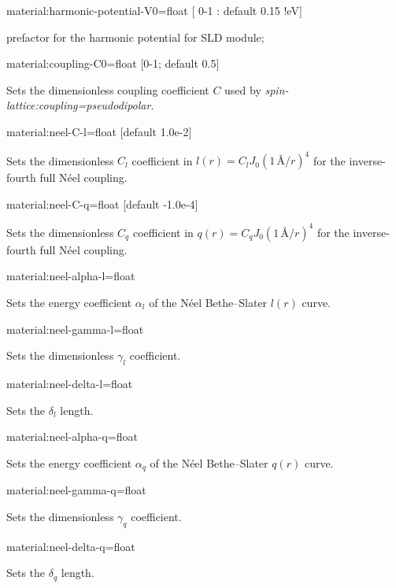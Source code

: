 {\zicf material:harmonic-potential-V0=float [ 0-1 : default 0.15 !eV]}  prefactor for the harmonic potential for SLD module;

{\zicf material:coupling-C0=float [0-1; default 0.5]}
Sets the dimensionless coupling coefficient $C$ used by \textit{spin-lattice:coupling=pseudodipolar}.

{\zicf material:neel-C-l=float [default 1.0e-2]}
Sets the dimensionless $C_l$ coefficient in $l(r)=C_lJ_0(1\,\text{\AA}/r)^4$ for the inverse-fourth full N\'eel coupling.

{\zicf material:neel-C-q=float [default -1.0e-4]}
Sets the dimensionless $C_q$ coefficient in $q(r)=C_qJ_0(1\,\text{\AA}/r)^4$ for the inverse-fourth full N\'eel coupling.

{\zicf material:neel-alpha-l=float}
Sets the energy coefficient $\alpha_l$ of the N\'eel Bethe--Slater $l(r)$ curve. 

{\zicf material:neel-gamma-l=float}
Sets the dimensionless $\gamma_l$ coefficient. 

{\zicf material:neel-delta-l=float}
Sets the $\delta_l$ length. 

{\zicf material:neel-alpha-q=float}
Sets the energy coefficient $\alpha_q$ of the N\'eel Bethe--Slater $q(r)$ curve. 

{\zicf material:neel-gamma-q=float}
Sets the dimensionless $\gamma_q$ coefficient.

{\zicf material:neel-delta-q=float}
Sets the $\delta_q$ length. 











%

